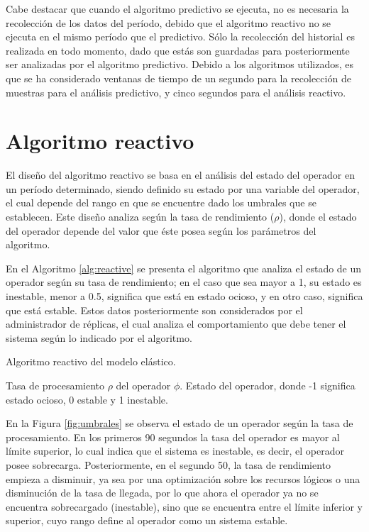 Cabe destacar que cuando el algoritmo predictivo se ejecuta, no es necesaria la recolección de los datos del período, debido que el algoritmo reactivo no se ejecuta en el mismo período que el predictivo. Sólo la recolección del historial es realizada en todo momento, dado que estás son guardadas para posteriormente ser analizadas por el algoritmo predictivo. Debido a los algoritmos utilizados, es que se ha considerado ventanas de tiempo de un segundo para la recolección de muestras para el análisis predictivo, y cinco segundos para el análisis reactivo.

\section{Algoritmo reactivo}
El diseño del algoritmo reactivo se basa en el análisis del estado del operador en un período determinado, siendo definido su estado por una variable del operador, el cual depende del rango en que se encuentre dado los umbrales que se establecen. Este diseño analiza según la tasa de rendimiento ($\rho$), donde el estado del operador depende del valor que éste posea según los parámetros del algoritmo.

En el Algoritmo \ref{alg:reactive} se presenta el algoritmo que analiza el estado de un operador según su tasa de rendimiento; en el caso que sea mayor a 1, su estado es inestable, menor a 0.5, significa que está en estado ocioso, y en otro caso, significa que está estable. Estos datos posteriormente son considerados por el administrador de réplicas, el cual analiza el comportamiento que debe tener el sistema según lo indicado por el algoritmo.

\begin{algorithm}[!ht]
	\caption{Algoritmo reactivo del modelo elástico.}
	\label{alg:reactive}
	\begin{algorithmic}[1]
	\REQUIRE Tasa de procesamiento $\rho$ del operador $\phi$.
	\ENSURE Estado del operador, donde -1 significa estado ocioso, 0 estable y 1 inestable.
	\ELSE
	\ENDIF
	\end{algorithmic}
\end{algorithm}

En la Figura \ref{fig:umbrales} se observa el estado de un operador según la tasa de procesamiento. En los primeros 90 segundos la tasa del operador es mayor al límite superior, lo cual indica que el sistema es inestable, es decir, el operador posee sobrecarga. Posteriormente, en el segundo 50, la tasa de rendimiento empieza a disminuir, ya sea por una optimización sobre los recursos lógicos o una disminución de la tasa de llegada, por lo que ahora el operador ya no se encuentra sobrecargado (inestable), sino que se encuentra entre el límite inferior y superior, cuyo rango define al operador como un sistema estable.

